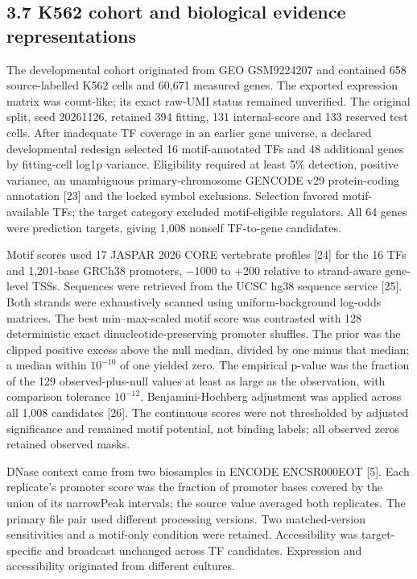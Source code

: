 \documentclass[
  11pt,
]{article}
\begin{document}
\subsection{3.7 K562 cohort and biological evidence
representations}\label{k562-cohort-and-biological-evidence-representations}

The developmental cohort originated from GEO GSM9224207 and contained
658 source-labelled K562 cells and 60,671 measured genes. The exported
expression matrix was count-like; its exact raw-UMI status remained
unverified. The original split, seed 20261126, retained 394 fitting, 131
internal-score and 133 reserved test cells. After inadequate TF coverage
in an earlier gene universe, a declared developmental redesign selected
16 motif-annotated TFs and 48 additional genes by fitting-cell log1p
variance. Eligibility required at least 5\% detection, positive
variance, an unambiguous primary-chromosome GENCODE v29 protein-coding
annotation {[}23{]} and the locked symbol exclusions. Selection favored
motif-available TFs; the target category excluded motif-eligible
regulators. All 64 genes were prediction targets, giving 1,008 nonself
TF-to-gene candidates.

Motif scores used 17 JASPAR 2026 CORE vertebrate profiles {[}24{]} for
the 16 TFs and 1,201-base GRCh38 promoters, −1000 to +200 relative to
strand-aware gene-level TSSs. Sequences were retrieved from the UCSC
hg38 sequence service {[}25{]}. Both strands were exhaustively scanned
using uniform-background log-odds matrices. The best min--max-scaled
motif score was contrasted with 128 deterministic exact
dinucleotide-preserving promoter shuffles. The prior was the clipped
positive excess above the null median, divided by one minus that median;
a median within \(10^{-10}\) of one yielded zero. The empirical p-value
was the fraction of the 129 observed-plus-null values at least as large
as the observation, with comparison tolerance \(10^{-12}\).
Benjamini-Hochberg adjustment was applied across all 1,008 candidates
{[}26{]}. The continuous scores were not thresholded by adjusted
significance and remained motif potential, not binding labels; all
observed zeros retained observed masks.

DNase context came from two biosamples in ENCODE ENCSR000EOT {[}5{]}.
Each replicate's promoter score was the fraction of promoter bases
covered by the union of its narrowPeak intervals; the source value
averaged both replicates. The primary file pair used different
processing versions. Two matched-version sensitivities and a motif-only
condition were retained. Accessibility was target-specific and broadcast
unchanged across TF candidates. Expression and accessibility originated
from different cultures.
\end{document}
